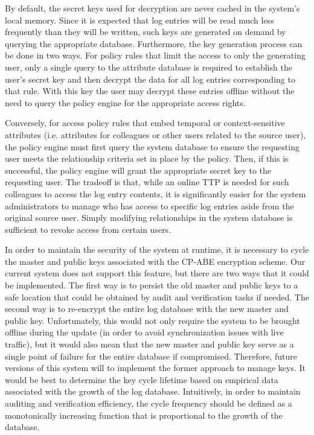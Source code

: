 \documentclass{sig-alternate}
\begin{document}
By default, the secret keys used for decryption are never cached in the system's local memory. Since it is
expected that log entries will be read much less frequently than they will be written, such keys are generated
on demand by querying the appropriate database. Furthermore, the key generation process can be done in two ways. 
For policy rules that limit the access to only the generating user, only a single query to the attribute database
is required to establish the user's secret key and then decrypt the data for all log entries corresponding to that rule. 
With this key the user may decrypt these entries offline without the need to query the policy engine for the 
appropriate access rights.

Conversely, for access policy rules that embed temporal or context-sensitive attributes (i.e. attributes for colleagues or other 
users related to the source user), the policy engine must first query the system database to ensure the requesting 
user meets the relationship criteria set in place by the policy. Then,
if this is successful, the policy engine will grant the appropriate secret key to the requesting user. The tradeoff
is that, while an online TTP is needed for such colleagues to access the log entry contents, it is significantly easier
for the system administrators to manage who has access to specific log entries aside from the original source user.
Simply modifying relationships in the system database is sufficient to revoke access from certain users.

In order to maintain the security of the system at runtime, it is necessary to cycle the master and public keys
associated with the CP-ABE encryption scheme. Our current system does not support this feature, but there are two
ways that it could be implemented. The first way is to persist the old master and 
public keys to a safe location that could be obtained by audit and verification tasks if needed. The second way is 
to re-encrypt the entire log database with the new master and public key. Unfortunately, this would not only require the system to be 
brought offline during the update (in order to avoid synchronization issues with live traffic), but it would also
mean that the new master and public key serve as a single point of failure for the entire database if compromised. 
Therefore, future versions of this system will to implement the former approach to manage keys. It would be
best to determine the key cycle lifetime based on empirical data associated with the growth of the log database.
Intuitively, in order to maintain auditing and verification efficiency, the cycle frequency should be defined as 
a monotonically increasing function that is proportional to the growth of the database. 
\end{document}
